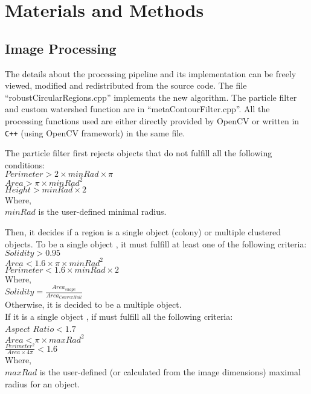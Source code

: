 \documentclass[10pt]{article}
\begin{document}
\section*{Materials and Methods} 

\subsection*{Image Processing} The details
about the processing pipeline and its implementation can be freely viewed,
modified and redistributed from the source code. The file
``robustCircularRegions.cpp'' implements the new algorithm. The particle filter
and custom watershed function are in ``metaContourFilter.cpp''.
All the processing functions used are either directly provided by OpenCV or
written in \texttt{C++} (using OpenCV framework) in the same file.

The particle filter first rejects objects that do not fulfill all the following conditions:\\
\newline{}
$Perimeter > 2\times{}minRad\times{}\pi $\\
$Area > \pi\times{}{minRad}^2$\\
$Height > minRad\times{}2$\\
\newline{}
Where,\\ 
$minRad$ is the user-defined minimal radius.

Then, it decides if a region is a single object (colony) or multiple clustered
objects. To be a single object
, it must fulfill at least one of the following
criteria:\\
\newline{}
$Solidity > 0.95$\\
$Area <  1.6 \times{}\pi\times{}{minRad}^2$\\
$Perimeter < 1.6 \times{} minRad\times{}2$\\
\newline{}
Where,\\ $Solidity = \frac{Area_{shape}}{Area_{ConvexHull}}$\\
\newline{}
Otherwise, it is decided to be a multiple object.\\

If it is a single object
, if must fulfill all the following criteria:\\
\newline{}
$Aspect$ $Ratio < 1.7$\\
$Area <  \pi\times{}{maxRad}^2$\\
$\frac{Perimeter^2}{Area \times{} 4\pi } < 1.6$
\newline{}\\
Where,\\
$maxRad$ is the user-defined (or calculated from the image dimensions) maximal radius for an object.\\
\end{document}
